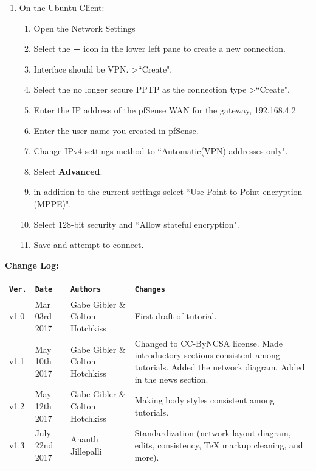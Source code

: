 \documentclass[12pt]{extarticle}
\begin{document}
\begin{enumerate}
\item On the Ubuntu Client:
    \begin{enumerate}
        \item Open the Network Settings
        \item Select the \textbf{+} icon in the lower left pane to create a new connection.
        \item Interface should be VPN. \textgreater ``Create".
        \item Select the no longer secure PPTP as the connection type \textgreater ``Create".
        \item Enter the IP address of the pfSense WAN for the gateway, 192.168.4.2
        \item Enter the user name you created in pfSense.
        \item Change IPv4 settings method to ``Automatic(VPN) addresses only".
        \item Select \textbf{Advanced}.
        \item in addition to the current settings select ``Use Point-to-Point encryption (MPPE)".
        \item Select 128-bit security and ``Allow stateful encryption".
        \item Save and attempt to connect.
    \end{enumerate}
\end{enumerate}


 
\pagebreak
\textbf{Change Log:}
\label{changelog}

\vspace{4mm}
{
\begin{tabular}{ |p{1cm}|p{3cm}|p{4cm}|p{7cm}|  }
	\hline
	\texttt{\textbf{Ver.}} & \texttt{\textbf{Date}} & \texttt{\textbf{Authors}} & \texttt{\textbf{Changes}} \\
	\hline
	v1.0 & Mar 03rd 2017 & Gabe Gibler \& Colton Hotchkiss & First draft of tutorial. \\
	\hline
	v1.1 & May 10th 2017 & Gabe Gibler \& Colton Hotchkiss & Changed to CC-ByNCSA license. Made introductory sections consistent among tutorials. Added the network diagram. Added in the news section. \\
	\hline
	v1.2 & May 12th 2017 & Gabe Gibler \& Colton Hotchkiss & Making body styles consistent among tutorials. \\
	\hline
	v1.3 & July 22nd 2017 & Ananth Jillepalli & Standardization (network layout diagram, edits, consistency, TeX markup cleaning, and more). \\
	\hline

\end{tabular}
}


	





\pagebreak

	
\end{document}
